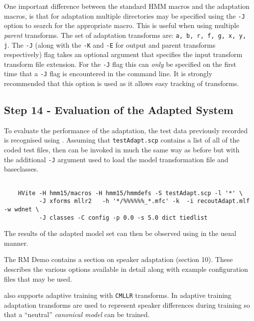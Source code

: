 One important difference between the standard HMM macros and the
adaptation macros, is that for adaptation multiple directories may be
specified using the {\tt -J} option to search for the appropriate macro. 
This is useful when using multiple {\em parent} transforms. The set of adaptation
transforms are: {\tt a, b, r, f, g, x, y, j}. The {\tt -J} (along with the
{\tt -K} and {\tt -E} for output and parent transforms respectively) flag 
takes an optional argument that specifies the input transform transform
file extension. For the {\tt -J} flag this can {\em only} be specified on the
first time that a {\tt -J} flag is encountered in the command line. It
is strongly recommended that this option is used as it allows easy tracking
of transforms.

\subsection{Step 14 - Evaluation of the Adapted System}

To evaluate the performance of the adaptation, the test data previously recorded 
is recognised using . Assuming that \texttt{testAdapt.scp} contains a list 
of all of the coded test files, then  can be invoked in much the same way 
as before but with the additional \texttt{-J} argument used to load the model 
transformation file and  baseclasses.

\begin{verbatim}

    HVite -H hmm15/macros -H hmm15/hmmdefs -S testAdapt.scp -l '*' \ 
          -J xforms mllr2   -h '*/%%%%%%_*.mfc' -k  -i recoutAdapt.mlf -w wdnet \ 
          -J classes -C config -p 0.0 -s 5.0 dict tiedlist

\end{verbatim}

\noindent
The results of the adapted model set can then be observed using  
in the usual manner.
 
The RM Demo contains a section on speaker adaptation (section 10). These describes
the various options available  in detail along with example configuration files that
may be used.

 also supports adaptive training with {\tt CMLLR} transforms. In
adaptive training adaptation transforms are used to represent speaker
differences during training so that a ``neutral'' {\em canonical model}  can be
trained. 

